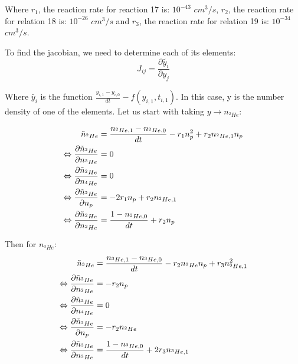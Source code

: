 \documentclass[a4paper,12pt]{article}
\begin{document}
Where $r_1$, the reaction rate for reaction 17 is: $10^{-43}$ $cm^3/s$, $r_2$, the reaction rate for relation 18 is: $10^{-26}$ $cm^3/s$ and $r_3$, the reaction rate for relation 19 is: $10^{-34}$ $cm^3/s$.

To find the jacobian, we need to determine each of its elements:
$$J_{ij} = \frac{\partial \tilde{y_i}}{\partial y_j}$$

Where $\tilde{y_i}$ is the function $\frac{y_{i,1} - y_{i,0}}{dt} - f(y_{i,1}, t_{i,1})$. In this case, y is the number density of one of the elements. Let us start with taking $y \rightarrow n_{^2He}$:

\begin{equation*}
\centering
\begin{split}
\tilde{n}_{^2He} &= \frac{n_{^2He, 1} - n_{^2He, 0}}{dt} - r_1n_p^2 + r_2n_{^2He, 1}n_p\\
\Leftrightarrow \frac{\partial \tilde{n}_{^2He}}{\partial n_{^3He}} &= 0\\
\Leftrightarrow \frac{\partial \tilde{n}_{^2He}}{\partial n_{^4He}} &= 0\\
\Leftrightarrow \frac{\partial \tilde{n}_{^2He}}{\partial n_{p}} &= -2r_1n_p + r_2n_{^2He, 1}\\
\Leftrightarrow \frac{\partial \tilde{n}_{^2He}}{\partial n_{^2He}} &= \frac{1 - n_{^2He, 0}}{dt} + r_2n_p\\
\end{split}
\end{equation*}

Then for $n_{^3He}$:
\begin{equation*}
    \centering
    \begin{split}
        \tilde{n}_{^3He} &= \frac{n_{^3He, 1} - n_{^3He, 0}}{dt} - r_2n_{^2He}n_p + r_3n^2_{^3He, 1}\\
        \Leftrightarrow \frac{\partial \tilde{n}_{^3He}}{\partial n_{^2He}} &= -r_2n_p\\
        \Leftrightarrow \frac{\partial \tilde{n}_{^3He}}{\partial n_{^4He}} &= 0\\
        \Leftrightarrow \frac{\partial \tilde{n}_{^3He}}{\partial n_p} &= - r_2n_{^2He}\\
        \Leftrightarrow \frac{\partial \tilde{n}_{^3He}}{\partial n_{^3He}} &= \frac{1 - n_{^3He, 0}}{dt} + 2r_3n_{^3He, 1}\\
    \end{split}
\end{equation*}
\end{document}
